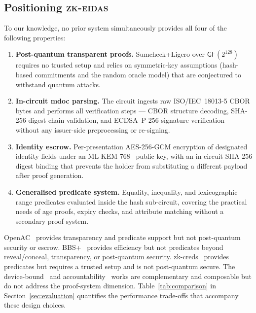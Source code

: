 \subsection{Positioning \textsc{zk-eidas}}\label{sec:rel-position}

To our knowledge, no prior system simultaneously provides all four of
the following properties:

\begin{enumerate}
  \item \textbf{Post-quantum transparent proofs.}
    Sumcheck+Ligero over $\mathsf{GF}(2^{128})$ requires no trusted
    setup and relies on symmetric-key assumptions (hash-based commitments
    and the random oracle model) that are conjectured to withstand quantum
    attacks.
  \item \textbf{In-circuit mdoc parsing.}
    The circuit ingests raw ISO/IEC~18013-5 CBOR bytes and performs
    all verification steps --- CBOR structure decoding, SHA-256 digest
    chain validation, and ECDSA~P-256 signature verification --- without
    any issuer-side preprocessing or re-signing.
  \item \textbf{Identity escrow.}
    Per-presentation AES-256-GCM encryption of designated identity fields
    under an ML-KEM-768~\cite{fips203} public key, with an in-circuit
    SHA-256 digest binding that prevents the holder from substituting a
    different payload after proof generation.
  \item \textbf{Generalised predicate system.}
    Equality, inequality, and lexicographic range predicates evaluated
    inside the hash sub-circuit, covering the practical needs of age
    proofs, expiry checks, and attribute matching without a secondary
    proof system.
\end{enumerate}

OpenAC~\cite{openac} provides transparency and predicate support but not
post-quantum security or escrow.
BBS+~\cite{bbs} provides efficiency but not predicates beyond
reveal/conceal, transparency, or post-quantum security.
zk-creds~\cite{zkcreds} provides predicates but requires a trusted setup
and is not post-quantum secure.
The device-bound~\cite{device-bound} and accountability~\cite{accountability-ac}
works are complementary and composable but do not address the
proof-system dimension.
Table~\ref{tab:comparison} in Section~\ref{sec:evaluation} quantifies the
performance trade-offs that accompany these design choices.
